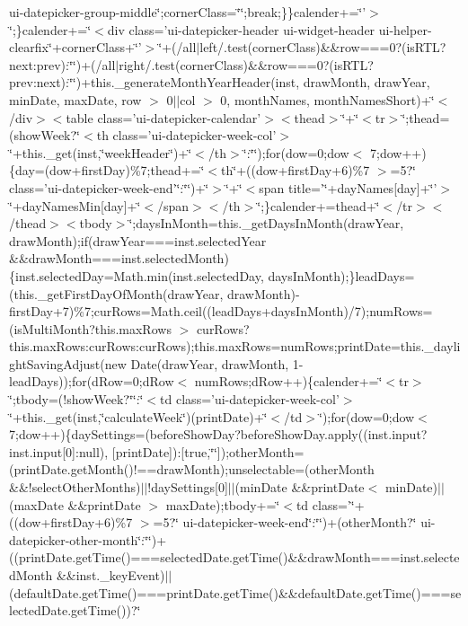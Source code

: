 {{\begin{DoxyParamCaption}
ui-\/datepicker-\/group-\/middle\char`\"{};corner\+Class=\char`\"{}\char`\"{};break;\}\}calender+=\char`\"{}'$>$\char`\"{};\}calender+=\char`\"{}$<$div class='ui-\/datepicker-\/header ui-\/widget-\/header ui-\/helper-\/clearfix\char`\"{}+corner\+Class+\char`\"{}'$>$\char`\"{}+(/all$\vert$left/.\+test(corner\+Class)\&\&row===0?(is\+R\+T\+L?next\+:prev)\+:\char`\"{}\char`\"{})+(/all$\vert$right/.\+test(corner\+Class)\&\&row===0?(is\+R\+T\+L?prev\+:next)\+:\char`\"{}\char`\"{})+this.\+\_\+generate\+Month\+Year\+Header(inst, draw\+Month, draw\+Year, min\+Date, max\+Date, row $>$ 0$\vert$$\vert$col $>$ 0, month\+Names, month\+Names\+Short)+\char`\"{}$<$/div$>$$<$table class='ui-\/datepicker-\/calendar'$>$$<$thead$>$\char`\"{}+\char`\"{}$<$tr$>$\char`\"{};thead=(show\+Week?\char`\"{}$<$th class='ui-\/datepicker-\/week-\/col'$>$\char`\"{}+this.\+\_\+get(inst,\char`\"{}week\+Header\char`\"{})+\char`\"{}$<$/th$>$\char`\"{}\+:\char`\"{}\char`\"{});for(dow=0;dow$<$ 7;dow++)\{day=(dow+first\+Day)\%7;thead+=\char`\"{}$<$th\char`\"{}+((dow+first\+Day+6)\%7 $>$=5?\char`\"{} class='ui-\/datepicker-\/week-\/end'\char`\"{}\+:\char`\"{}\char`\"{})+\char`\"{}$>$\char`\"{}+\char`\"{}$<$span title='\char`\"{}+day\+Names\mbox{[}day\mbox{]}+\char`\"{}'$>$\char`\"{}+day\+Names\+Min\mbox{[}day\mbox{]}+\char`\"{}$<$/span$>$$<$/th$>$\char`\"{};\}calender+=thead+\char`\"{}$<$/tr$>$$<$/thead$>$$<$tbody$>$\char`\"{};days\+In\+Month=this.\+\_\+get\+Days\+In\+Month(draw\+Year, draw\+Month);if(draw\+Year===inst.\+selected\+Year \&\&draw\+Month===inst.\+selected\+Month)\{inst.\+selected\+Day=\+Math.\+min(inst.\+selected\+Day, days\+In\+Month);\}lead\+Days=(this.\+\_\+get\+First\+Day\+Of\+Month(draw\+Year, draw\+Month)-\/first\+Day+7)\%7;cur\+Rows=\+Math.\+ceil((lead\+Days+days\+In\+Month)/7);num\+Rows=(is\+Multi\+Month?this.\+max\+Rows $>$ cur\+Rows?this.\+max\+Rows\+:cur\+Rows\+:cur\+Rows);this.\+max\+Rows=num\+Rows;print\+Date=this.\+\_\+daylight\+Saving\+Adjust(new Date(draw\+Year, draw\+Month, 1-\/lead\+Days));for(d\+Row=0;d\+Row$<$ num\+Rows;d\+Row++)\{calender+=\char`\"{}$<$tr$>$\char`\"{};tbody=(!show\+Week?\char`\"{}\char`\"{}\+:\char`\"{}$<$td class='ui-\/datepicker-\/week-\/col'$>$\char`\"{}+this.\+\_\+get(inst,\char`\"{}calculate\+Week\char`\"{})(print\+Date)+\char`\"{}$<$/td$>$\char`\"{});for(dow=0;dow$<$ 7;dow++)\{day\+Settings=(before\+Show\+Day?before\+Show\+Day.\+apply((inst.\+input?inst.\+input\mbox{[}0\mbox{]}\+:null), \mbox{[}print\+Date\mbox{]})\+:\mbox{[}true,\char`\"{}\char`\"{}\mbox{]});other\+Month=(print\+Date.\+get\+Month()!==draw\+Month);unselectable=(other\+Month \&\&!select\+Other\+Months)$\vert$$\vert$!day\+Settings\mbox{[}0\mbox{]}$\vert$$\vert$(min\+Date \&\&print\+Date$<$ min\+Date)$\vert$$\vert$(max\+Date \&\&print\+Date $>$ max\+Date);tbody+=\char`\"{}$<$td class='\char`\"{}+((dow+first\+Day+6)\%7 $>$=5?\char`\"{} ui-\/datepicker-\/week-\/end\char`\"{}\+:\char`\"{}\char`\"{})+(other\+Month?\char`\"{} ui-\/datepicker-\/other-\/month\char`\"{}\+:\char`\"{}\char`\"{})+((print\+Date.\+get\+Time()===selected\+Date.\+get\+Time()\&\&draw\+Month===inst.\+selected\+Month \&\&inst.\+\_\+key\+Event)$\vert$$\vert$(default\+Date.\+get\+Time()===print\+Date.\+get\+Time()\&\&default\+Date.\+get\+Time()===selected\+Date.\+get\+Time())?\char`\"{} 
\end{DoxyParamCaption}}}
